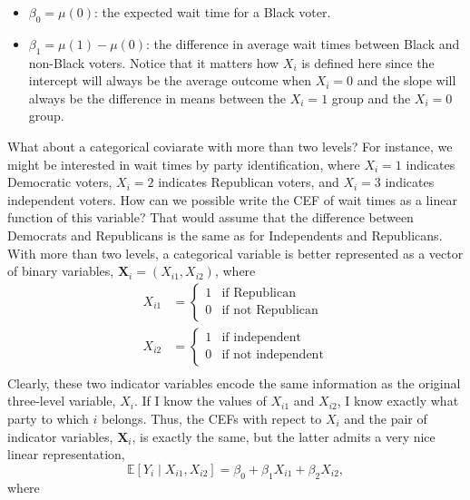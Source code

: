 \documentclass[
  letterpaper,
  DIV=11,
  numbers=noendperiod]{scrreprt}
\providecommand{\tightlist}{%
  \setlength{\itemsep}{0pt}\setlength{\parskip}{0pt}}\usepackage{longtable,booktabs,array}
\newcommand{\mb}{\symbf}
\newcommand{\E}{\mathbb{E}}
\newcommand{\X}{\mb{X}}
\theoremstyle{definition}
\theoremstyle{plain}
\theoremstyle{definition}
\theoremstyle{remark}
\begin{document}
\begin{itemize}
\tightlist
\item
  \(\beta_0 = \mu(0)\): the expected wait time for a Black voter.
\item
  \(\beta_1 = \mu(1) - \mu(0)\): the difference in average wait times
  between Black and non-Black voters. Notice that it matters how
  \(X_{i}\) is defined here since the intercept will always be the
  average outcome when \(X_i = 0\) and the slope will always be the
  difference in means between the \(X_i = 1\) group and the \(X_i = 0\)
  group.
\end{itemize}

What about a categorical coviarate with more than two levels? For
instance, we might be interested in wait times by party identification,
where \(X_i = 1\) indicates Democratic voters, \(X_i = 2\) indicates
Republican voters, and \(X_i = 3\) indicates independent voters. How can
we possible write the CEF of wait times as a linear function of this
variable? That would assume that the difference between Democrats and
Republicans is the same as for Independents and Republicans. With more
than two levels, a categorical variable is better represented as a
vector of binary variables, \(\X_i = (X_{i1}, X_{i2})\), where \[ 
\begin{aligned}
  X_{{i1}} &= \begin{cases}
                1&\text{if Republican} \\
                   0 & \text{if not Republican}
              \end{cases} \\
X_{{i2}} &= \begin{cases}
                1&\text{if independent} \\
                   0 & \text{if not independent}
              \end{cases} \\
\end{aligned}
\] Clearly, these two indicator variables encode the same information as
the original three-level variable, \(X_{i}\). If I know the values of
\(X_{i1}\) and \(X_{i2}\), I know exactly what party to which \(i\)
belongs. Thus, the CEFs with repect to \(X_i\) and the pair of indicator
variables, \(\X_i\), is exactly the same, but the latter admits a very
nice linear representation, \[
\E[Y_i \mid X_{i1}, X_{i2}] = \beta_0 + \beta_1 X_{i1} + \beta_2 X_{i2},
\] where
\end{document}

